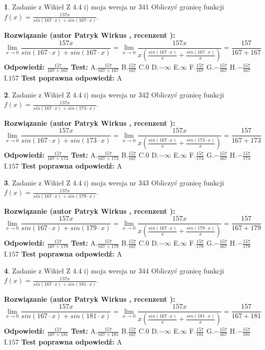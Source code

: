 \documentclass[12pt, a4paper]{article}
\theoremstyle{definition} %
\newtheorem{zad}{}
\newcommand{\zadStart}[1]{\begin{zad}#1\newline}
\newcommand{\zadStop}{\end{zad}}
\newcommand{\rozwStart}[2]{\noindent \textbf{Rozwiązanie (autor #1 , recenzent #2): }\newline}
\newcommand{\rozwStop}{\newline}
\newcommand{\odpStart}{\noindent \textbf{Odpowiedź:}\newline}
\newcommand{\odpStop}{\newline}
\newcommand{\testStart}{\noindent \textbf{Test:}\newline}
\newcommand{\testStop}{\newline}
\newcommand{\kluczStart}{\noindent \textbf{Test poprawna odpowiedź:}\newline}
\newcommand{\kluczStop}{\newline}
\begin{document}
\zadStart{Zadanie z Wikieł Z 4.4 i) moja wersja nr 341}
Obliczyć granicę funkcji $f(x)=\frac{157x}{sin(167\cdot x) +sin(167\cdot x)}$.
\zadStop
\rozwStart{Patryk Wirkus}{}
$$\lim\limits_{x\to 0}\frac{157x}{sin(167\cdot x) +sin(167\cdot x)}=\lim\limits_{x\to 0}\frac{157x}{x(\frac{sin(167\cdot x)}{x}+\frac{sin(167\cdot x)}{x})}=\frac{157}{167+167}$$
\rozwStop
\odpStart
$\frac{157}{167+167}$
\odpStop
\testStart
A.$\frac{157}{167+167}$
B.$\frac{157}{167}$
C.$0$
D.$-\infty$
E.$\infty$
F.$\frac{157}{167}$
G.$-\frac{157}{167}$
H.$-\frac{157}{167}$
I.$157$
\testStop
\kluczStart
A
\kluczStop



\zadStart{Zadanie z Wikieł Z 4.4 i) moja wersja nr 342}
Obliczyć granicę funkcji $f(x)=\frac{157x}{sin(167\cdot x) +sin(173\cdot x)}$.
\zadStop
\rozwStart{Patryk Wirkus}{}
$$\lim\limits_{x\to 0}\frac{157x}{sin(167\cdot x) +sin(173\cdot x)}=\lim\limits_{x\to 0}\frac{157x}{x(\frac{sin(167\cdot x)}{x}+\frac{sin(173\cdot x)}{x})}=\frac{157}{167+173}$$
\rozwStop
\odpStart
$\frac{157}{167+173}$
\odpStop
\testStart
A.$\frac{157}{167+173}$
B.$\frac{157}{167}$
C.$0$
D.$-\infty$
E.$\infty$
F.$\frac{157}{173}$
G.$-\frac{157}{167}$
H.$-\frac{157}{173}$
I.$157$
\testStop
\kluczStart
A
\kluczStop



\zadStart{Zadanie z Wikieł Z 4.4 i) moja wersja nr 343}
Obliczyć granicę funkcji $f(x)=\frac{157x}{sin(167\cdot x) +sin(179\cdot x)}$.
\zadStop
\rozwStart{Patryk Wirkus}{}
$$\lim\limits_{x\to 0}\frac{157x}{sin(167\cdot x) +sin(179\cdot x)}=\lim\limits_{x\to 0}\frac{157x}{x(\frac{sin(167\cdot x)}{x}+\frac{sin(179\cdot x)}{x})}=\frac{157}{167+179}$$
\rozwStop
\odpStart
$\frac{157}{167+179}$
\odpStop
\testStart
A.$\frac{157}{167+179}$
B.$\frac{157}{167}$
C.$0$
D.$-\infty$
E.$\infty$
F.$\frac{157}{179}$
G.$-\frac{157}{167}$
H.$-\frac{157}{179}$
I.$157$
\testStop
\kluczStart
A
\kluczStop



\zadStart{Zadanie z Wikieł Z 4.4 i) moja wersja nr 344}
Obliczyć granicę funkcji $f(x)=\frac{157x}{sin(167\cdot x) +sin(181\cdot x)}$.
\zadStop
\rozwStart{Patryk Wirkus}{}
$$\lim\limits_{x\to 0}\frac{157x}{sin(167\cdot x) +sin(181\cdot x)}=\lim\limits_{x\to 0}\frac{157x}{x(\frac{sin(167\cdot x)}{x}+\frac{sin(181\cdot x)}{x})}=\frac{157}{167+181}$$
\rozwStop
\odpStart
$\frac{157}{167+181}$
\odpStop
\testStart
A.$\frac{157}{167+181}$
B.$\frac{157}{167}$
C.$0$
D.$-\infty$
E.$\infty$
F.$\frac{157}{181}$
G.$-\frac{157}{167}$
H.$-\frac{157}{181}$
I.$157$
\testStop
\kluczStart
A
\kluczStop
\end{document}
